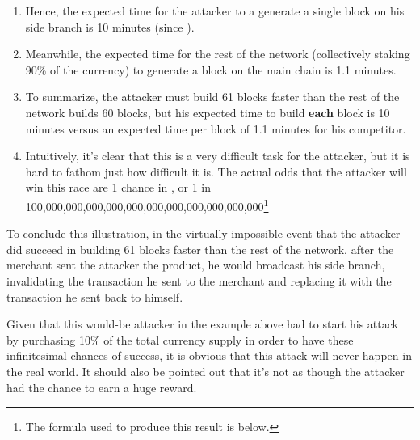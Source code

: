 \documentclass[a4paper,11pt]{article}
\begin{document}
\begin{enumerate}
{\begin{enumerate}
	\item{Hence, the expected time for the attacker to a generate a single block on his side branch is 10 minutes (since ).}
	\item{Meanwhile, the expected time for the rest of the network (collectively staking 90\% of the currency) to generate a block on the main chain is 1.1 minutes.}
	\item{To summarize, the attacker must build 61 blocks faster than the rest of the network builds 60 blocks, but his expected time to build \textbf{each} block is 10 minutes versus an expected time per block of 1.1 minutes for his competitor.}
	\item{Intuitively, it's clear that this is a very difficult task for the attacker, but it is hard to fathom just how difficult it is. The actual odds that the attacker will win this race are 1 chance in , or 1 in 100,000,000,000,000,000,000,000,000,000,000,000\footnote{The formula used to produce this result is below.} 
}
	\end{enumerate}
\item{To conclude this illustration, in the virtually impossible event that the attacker did succeed in building 61 blocks faster than the rest of the network, after the merchant sent the attacker the product, he would broadcast his side branch, invalidating the transaction he sent to the merchant and replacing it with the transaction he sent back to himself.}
}
\end{enumerate}
  
Given that this would-be attacker in the example above had to start his attack by purchasing 10\% of the total currency supply in order to have these infinitesimal chances of success, it is obvious that this attack will never happen in the real world. It should also be pointed out that it's not as though the attacker had the chance to earn a huge reward. 
\end{document}
